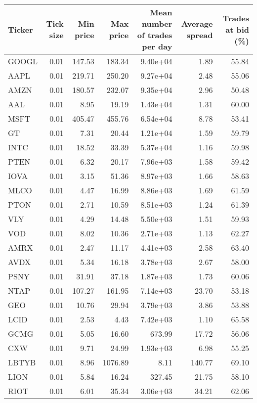 \begin{table}[H]
\centering
\small
\begin{tabular}{lrrrrrr}
\toprule
Ticker & Tick size & Min price & Max price & Mean number of trades per day & Average spread & Trades at bid (\%) \\
\midrule
GOOGL & 0.01 & 147.53 & 183.34 & 9.40e+04 & 1.89 & 55.84 \\
AAPL & 0.01 & 219.71 & 250.20 & 9.27e+04 & 2.48 & 55.06 \\
AMZN & 0.01 & 180.57 & 232.07 & 9.35e+04 & 2.96 & 50.48 \\
AAL & 0.01 & 8.95 & 19.19 & 1.43e+04 & 1.31 & 60.00 \\
MSFT & 0.01 & 405.47 & 455.76 & 6.54e+04 & 8.78 & 53.41 \\
GT & 0.01 & 7.31 & 20.44 & 1.21e+04 & 1.59 & 59.79 \\
INTC & 0.01 & 18.52 & 33.39 & 5.37e+04 & 1.16 & 59.98 \\
PTEN & 0.01 & 6.32 & 20.17 & 7.96e+03 & 1.58 & 59.42 \\
IOVA & 0.01 & 3.15 & 51.36 & 8.97e+03 & 1.66 & 58.63 \\
MLCO & 0.01 & 4.47 & 16.99 & 8.86e+03 & 1.69 & 61.59 \\
PTON & 0.01 & 2.71 & 10.59 & 8.51e+03 & 1.24 & 61.39 \\
VLY & 0.01 & 4.29 & 14.48 & 5.50e+03 & 1.51 & 59.93 \\
VOD & 0.01 & 8.02 & 10.36 & 2.71e+03 & 1.13 & 62.27 \\
AMRX & 0.01 & 2.47 & 11.17 & 4.41e+03 & 2.58 & 63.40 \\
AVDX & 0.01 & 5.34 & 16.18 & 3.78e+03 & 2.67 & 58.00 \\
PSNY & 0.01 & 31.91 & 37.18 & 1.87e+03 & 1.73 & 60.06 \\
NTAP & 0.01 & 107.27 & 161.95 & 7.14e+03 & 23.70 & 53.18 \\
GEO & 0.01 & 10.76 & 29.94 & 3.79e+03 & 3.86 & 53.88 \\
LCID & 0.01 & 2.53 & 4.43 & 7.42e+03 & 1.10 & 65.58 \\
GCMG & 0.01 & 5.05 & 16.60 & 673.99 & 17.72 & 56.06 \\
CXW & 0.01 & 9.71 & 24.99 & 1.93e+03 & 6.98 & 55.25 \\
LBTYB & 0.01 & 8.96 & 1076.89 & 8.11 & 140.77 & 69.10 \\
LION & 0.01 & 5.84 & 16.24 & 327.45 & 21.75 & 58.10 \\
RIOT & 0.01 & 6.01 & 35.34 & 3.06e+03 & 34.21 & 62.06 \\

\end{tabular}
\end{table}

